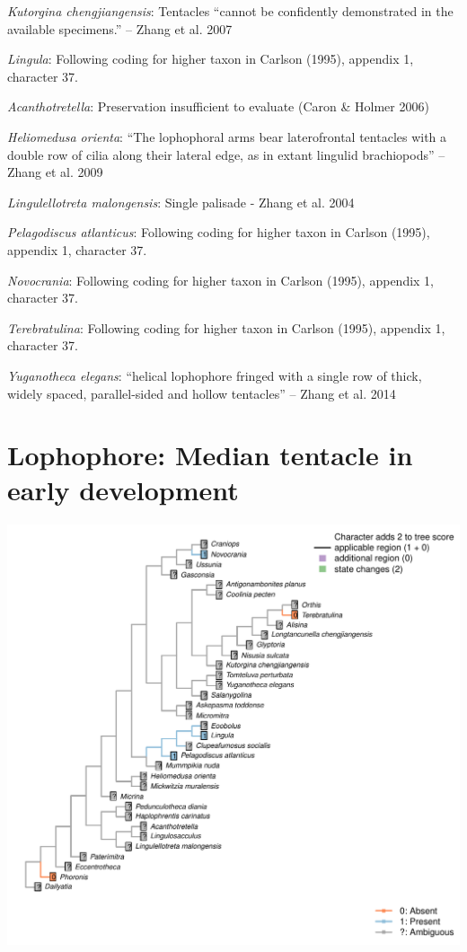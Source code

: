 \documentclass[]{book}
\theoremstyle{definition}
\theoremstyle{definition}
\theoremstyle{definition}
\theoremstyle{remark}
\begin{document}
\emph{Kutorgina chengjiangensis}: Tentacles ``cannot be confidently
demonstrated in the available specimens.'' -- Zhang et al. 2007

\emph{Lingula}: Following coding for higher taxon in Carlson (1995),
appendix 1, character 37.

\emph{Acanthotretella}: Preservation insufficient to evaluate (Caron \&
Holmer 2006)

\emph{Heliomedusa orienta}: ``The lophophoral arms bear laterofrontal
tentacles with a double row of cilia along their lateral edge, as in
extant lingulid brachiopods'' -- Zhang et al. 2009

\emph{Lingulellotreta malongensis}: Single palisade - Zhang et al. 2004

\emph{Pelagodiscus atlanticus}: Following coding for higher taxon in
Carlson (1995), appendix 1, character 37.

\emph{Novocrania}: Following coding for higher taxon in Carlson (1995),
appendix 1, character 37.

\emph{Terebratulina}: Following coding for higher taxon in Carlson
(1995), appendix 1, character 37.

\emph{Yuganotheca elegans}: ``helical lophophore fringed with a single
row of thick, widely spaced, parallel-sided and hollow tentacles'' --
Zhang et al. 2014

\hypertarget{lophophore-median-tentacle-in-early-development}{%
\section*{Lophophore: Median tentacle in early
development}\label{lophophore-median-tentacle-in-early-development}}

\includegraphics{Brachiopod_phylogeny_files/figure-latex/unnamed-chunk-5-87.pdf}
\end{document}
